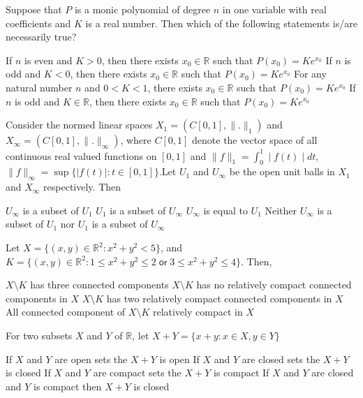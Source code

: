 \documentclass[10pt]{exam}
\DeclareMathOperator{\orr}{\textsf{or}}
\newcommand{\R}{\ensuremath{\mathbb{R}}}
\begin{document}
\begin{questions}
\question 
Suppose that $P$ is a monic polynomial of degree $n$ in one variable with real coefficients and $K$ is a real number. Then which of the following statements is/are necessarily true?

\begin{checkboxes}
\choice If $n$ is even and $K > 0$, then there exists $x_0 \in \mathbb{R}$ such that $P(x_0) = K e^{x_0}$
\choice If $n$ is odd and $K < 0$, then there exists $x_0 \in \mathbb{R}$ such that $P(x_0) = K e^{x_0}$
\choice For any natural number $n$ and $0 < K < 1$, there exists $x_0 \in \mathbb{R}$ such that $P(x_0) = K e^{x_0}$
\choice If $n$ is odd and $K \in \mathbb{R}$, then there exists $x_0 \in \mathbb{R}$ such that $P(x_0) = K e^{x_0}$
\end{checkboxes}


\question 
Consider the normed linear spaces $X_1 = (C[0,1], \|.\|_1)$ and $X_{\infty} = (C[0,1], \|.\|_{\infty})$, where $C[0,1]$ denote the vector space of all continuous real valued functions on $[0,1]$ and $\|f\|_1 = \int_0^1 \mid f(t) \mid dt$, $\|f \|_{\infty} = \sup \{|f(t)| : t \in [0,1] \}$.Let $U_1$ and $U_{\infty}$ be the open unit balls in $X_1$ and $X_{\infty}$ respectively. Then 

\begin{checkboxes}
\choice $U_{\infty}$ is a subset of $U_1$
\choice $U_1$ is a subset of $U_{\infty}$
\choice $U_{\infty}$ is equal to  $U_1$
\choice Neither $U_{\infty}$ is a subset of $U_1$ nor $U_1$ is a subset of $U_{\infty}$
\end{checkboxes}


\question 
Let $X = \{(x,y) \in \R^2: x^2 + y^2 <5 \}$, and $K = \{(x,y) \in \R^2: 1 \leq x^2 + y^2 \leq 2 \orr 3 \leq x^2 + y^2 \leq 4\}$. Then, 

\begin{checkboxes}
\choice $X \setminus K $ has three connected components
\choice $X \setminus K $ has no relatively compact  connected components in $X$ 
\choice $X \setminus K $ has two  relatively compact  connected components in $X$ 
\choice All connected component of $X \setminus K $   relatively compact  in $X$ 
\end{checkboxes}

\question 
For two subsets $X$ and $Y$ of $\R$, let $X+Y = \{x+y : x \in X, y \in Y\}$

\begin{checkboxes}
\choice If $X$ and $Y$ are open sets the $X + Y$ is open 
\choice If $X$ and $Y$ are closed  sets the $X + Y$ is closed  
\choice If $X$ and $Y$ are compact  sets the $X + Y$ is compact  
\choice If $X$ and $Y$ are closed and $Y$ is compact then $X + Y$ is closed 
\end{checkboxes} 


\end{questions}
\end{document}
